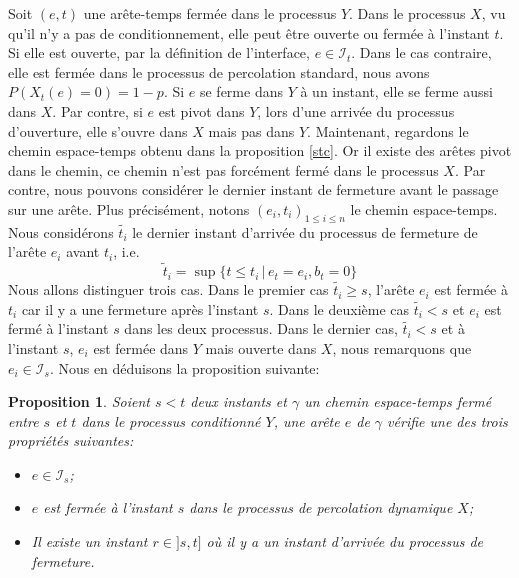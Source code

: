 \documentclass[titlepage,a4paper,12pt]{article}
\newcounter{th}
\newcounter{propo}
\newtheorem{prop}[propo]{Proposition}
\begin{document}
Soit $(e,t)$ une arête-temps fermée dans le processus $Y$. Dans le processus $X$, vu qu'il n'y a pas de conditionnement, elle peut être ouverte ou fermée à l'instant $t$. Si elle est ouverte, par la définition de l'interface, $e\in \mathcal{I}_t$. Dans le cas contraire, elle est fermée dans le processus de percolation standard, nous avons $P(X_t(e) = 0) = 1-p$. Si $e$ se ferme dans $Y$ à un instant, elle se ferme aussi dans $X$. Par contre, si $e$ est pivot dans $Y$, lors d'une arrivée du processus d'ouverture, elle s'ouvre dans $X$ mais pas dans $Y$. Maintenant, regardons le chemin espace-temps obtenu dans la proposition \ref{stc}. Or il existe des arêtes pivot dans le chemin, ce chemin n'est pas forcément fermé dans le processus $X$. Par contre, nous pouvons considérer le dernier instant de fermeture avant le passage sur une arête. Plus précisément, notons $(e_i,t_i)_{1\leqslant i \leqslant n}$ le chemin espace-temps. Nous considérons $\tilde{t_i}$ le dernier instant d'arrivée du processus de fermeture de l'arête $e_i$ avant $t_i$, i.e.
$$ \tilde{t}_i = \sup \big\{ t\leqslant t_i\,|\, e_{t} = e_i, b_t = 0\big\}
$$
Nous allons distinguer trois cas. Dans le premier cas $\tilde{t_i}\geqslant s$, l'arête $e_i$ est fermée à $t_i$ car il y a une fermeture après l'instant $s$. Dans le deuxième cas $\tilde{t_i}< s$ et $e_i$ est fermé à l'instant $s$ dans les deux processus. Dans le dernier cas, $\tilde{t_i}< s$ et à l'instant $s$, $e_i$ est fermée dans $Y$ mais ouverte dans $X$, nous remarquons que $e_i \in \mathcal{I}_s$. Nous en déduisons la proposition suivante:

\begin{prop}\label{couple} Soient $s<t$ deux instants et $\gamma$ un chemin espace-temps fermé entre $s$ et $t$ dans le processus conditionné $Y$, une arête $e$ de $\gamma$ vérifie une des trois propriétés suivantes:
\begin{itemize}[leftmargin = 0.9cm]
\item[(A)] $e\in \mathcal{I}_s$;
\item[(B)] $e$ est fermée à l'instant $s$ dans le processus de percolation dynamique $X$;
\item[(C)] Il existe un instant $r\in ]s,t]$ où il y a un instant d'arrivée du processus de fermeture.
\end{itemize}
\end{prop}
\end{document}
